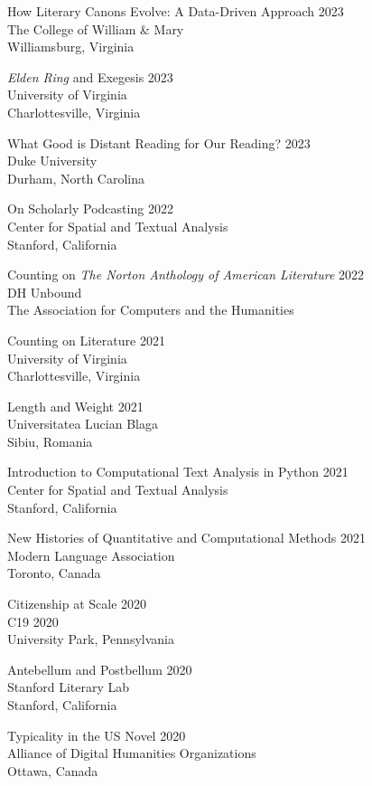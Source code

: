\documentclass[
  12pt,
  letterpaper,
]{article}
\begin{document}
How Literary Canons Evolve: A Data-Driven Approach \hfill 2023\\
The College of William \& Mary\\
Williamsburg, Virginia

\emph{Elden Ring} and Exegesis \hfill 2023\\
University of Virginia\\
Charlottesville, Virginia

What Good is Distant Reading for Our Reading? \hfill 2023\\
Duke University\\
Durham, North Carolina

On Scholarly Podcasting \hfill 2022\\
Center for Spatial and Textual Analysis\\
Stanford, California

Counting on \emph{The Norton Anthology of American Literature} \hfill 2022\\
DH Unbound\\
The Association for Computers and the Humanities

Counting on Literature \hfill 2021\\
University of Virginia\\
Charlottesville, Virginia

Length and Weight \hfill 2021\\
Universitatea Lucian Blaga\\
Sibiu, Romania

Introduction to Computational Text Analysis in Python \hfill 2021\\
Center for Spatial and Textual Analysis\\
Stanford, California

New Histories of Quantitative and Computational Methods \hfill 2021\\
Modern Language Association\\
Toronto, Canada

Citizenship at Scale \hfill 2020\\
C19 2020\\
University Park, Pennsylvania

Antebellum and Postbellum \hfill 2020\\
Stanford Literary Lab\\
Stanford, California

Typicality in the US Novel \hfill 2020\\
Alliance of Digital Humanities Organizations\\
Ottawa, Canada
\end{document}
